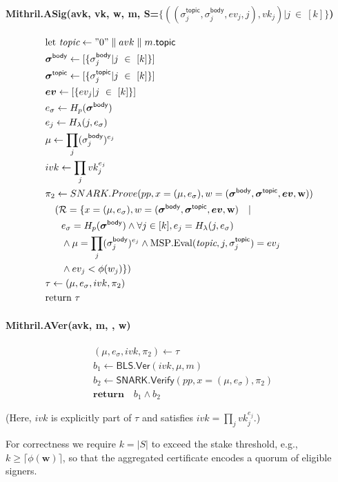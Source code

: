 \documentclass{article}
\begin{document}
\paragraph{Mithril.ASig(avk, \textbf{vk}, \textbf{w}, m, S=$\{((\sigma_j^{\mathsf{topic}},\sigma_j^{\mathsf{body}},ev_j,j),vk_j) | j\  \in\  [k]\}$)}
\begin{align*}
&\text{let } \textit{topic} \leftarrow "0" \parallel avk \parallel m.\mathsf{topic}\\
&\boldsymbol{\sigma}^{\mathsf{body}} \leftarrow [\{\sigma_j^{\mathsf{body}} | j\  \in\  [k]\}] \\
&\boldsymbol{\sigma}^{\mathsf{topic}} \leftarrow [\{\sigma_j^{\mathsf{topic}} | j\  \in\  [k]\}] \\
&\boldsymbol{ev} \leftarrow [\{ev_j | j\  \in\  [k]\}] \\
&e_{\sigma} \leftarrow H_p(\boldsymbol{\sigma}^{\mathsf{body}}) \\
&e_j \leftarrow H_\lambda(j, e_{\sigma}) \\
&\mu \leftarrow \prod_j (\sigma_j^{\mathsf{body}})^{e_j} \\
&ivk \leftarrow \prod_j vk_j^{e_j} \\
&\pi_2 \leftarrow SNARK.Prove(pp,x=(\mu, e_{\sigma}),w=(\boldsymbol{\sigma}^{\mathsf{body}},\boldsymbol{\sigma}^{\mathsf{topic}},\boldsymbol{ev},\textbf{w})) \\
&\quad (\mathcal{R} = \{x=(\mu, e_{\sigma}),w=(\boldsymbol{\sigma}^{\mathsf{body}},\boldsymbol{\sigma}^{\mathsf{topic}},\boldsymbol{ev},\textbf{w})\quad|\quad \\
&\quad \ \ e_{\sigma} = H_p(\boldsymbol{\sigma}^{\mathsf{body}}) \land \forall j \in [k], e_j = H_\lambda(j, e_{\sigma}) \\
&\quad \ \ \land \mu = \prod_j (\sigma_j^{\mathsf{body}})^{e_j} \land \mathrm{MSP.Eval}(\textit{topic}, j, \sigma_j^{\mathsf{topic}}) = ev_j \\
&\quad \ \ \land ev_j < \phi(w_j) \})\\ 
&\tau \leftarrow (\mu, e_{\sigma}, ivk, \pi_2) \\
&\text{return } \tau 
\end{align*}

\paragraph{Mithril.AVer(avk, m, \tau , w)}
\begin{align*}
&(\mu, e_{\sigma}, ivk, \pi_2) \leftarrow \tau \\
&b_1 \leftarrow \mathsf{BLS.Ver}(ivk,\mu,m) \\
&b_2 \leftarrow \mathsf{SNARK.Verify}(pp, x = (\mu,e_\sigma), \pi_2)\\
&\textbf{return}\quad b_1 \land b_2
\end{align*}

(Here, $ivk$ is explicitly part of $\tau$ and satisfies $ivk = \prod_j vk_j^{e_j}$.)

For correctness we require $k = |S|$ to exceed the stake threshold,
e.g., $k \ge \lceil \phi(\textbf{w}) \rceil$, so that the aggregated certificate
encodes a quorum of eligible signers.
\end{document}
